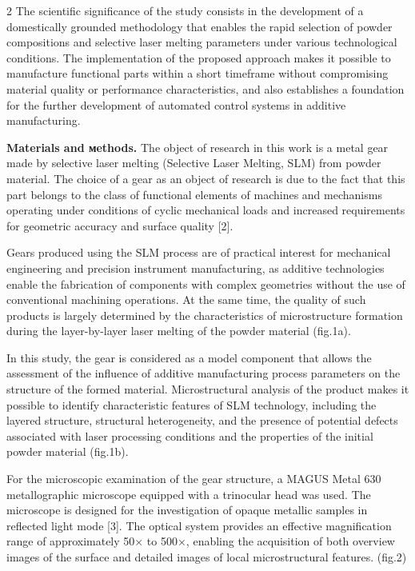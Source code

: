 \begin{multicols}{2}
The scientific significance of the study consists in the development of
a domestically grounded methodology that enables the rapid selection of
powder compositions and selective laser melting parameters under various
technological conditions. The implementation of the proposed approach
makes it possible to manufacture functional parts within a short
timeframe without compromising material quality or performance
characteristics, and also establishes a foundation for the further
development of automated control systems in additive manufacturing.

{\bfseries Materials and мethods.} The object of research in this work is a
metal gear made by selective laser melting (Selective Laser Melting,
SLM) from powder material. The choice of a gear as an object of research
is due to the fact that this part belongs to the class of functional
elements of machines and mechanisms operating under conditions of cyclic
mechanical loads and increased requirements for geometric accuracy and
surface quality {[}2{]}.

Gears produced using the SLM process are of practical interest for
mechanical engineering and precision instrument manufacturing, as
additive technologies enable the fabrication of components with complex
geometries without the use of conventional machining operations. At the
same time, the quality of such products is largely determined by the
characteristics of microstructure formation during the layer-by-layer
laser melting of the powder material (fig.1a).

In this study, the gear is considered as a model component that allows
the assessment of the influence of additive manufacturing process
parameters on the structure of the formed material. Microstructural
analysis of the product makes it possible to identify characteristic
features of SLM technology, including the layered structure, structural
heterogeneity, and the presence of potential defects associated with
laser processing conditions and the properties of the initial powder
material (fig.1b).

For the microscopic examination of the gear structure, a MAGUS Metal 630
metallographic microscope equipped with a trinocular head was used. The
microscope is designed for the investigation of opaque metallic samples
in reflected light mode {[}3{]}. The optical system provides an
effective magnification range of approximately 50× to 500×, enabling the
acquisition of both overview images of the surface and detailed images
of local microstructural features. (fig.2)
\end{multicols}

